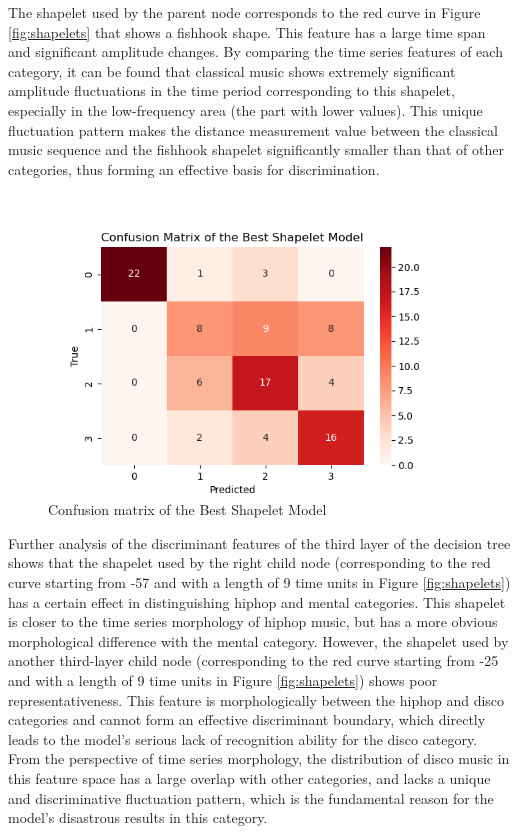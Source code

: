\noindent The shapelet used by the parent node corresponds to the red curve in Figure \ref{fig:shapelets} that shows a fishhook shape. This feature has a large time span and significant amplitude changes. By comparing the time series features of each category, it can be found that classical music shows extremely significant amplitude fluctuations in the time period corresponding to this shapelet, especially in the low-frequency area (the part with lower values). This unique fluctuation pattern makes the distance measurement value between the classical music sequence and the fishhook shapelet significantly smaller than that of other categories, thus forming an effective basis for discrimination.\\
\\
\begin{figure}[H]
	\centering
	\includegraphics[width=0.9\linewidth]{../Statistical_Sciences_template/figure/Confusion matrix of the Best Shapelet Model.png}
	\caption{Confusion matrix of the Best Shapelet Model}
	\label{fig:CMshapelet}
\end{figure}
\noindent Further analysis of the discriminant features of the third layer of the decision tree shows that the shapelet used by the right child node (corresponding to the red curve starting from -57 and with a length of 9 time units in Figure \ref{fig:shapelets}) has a certain effect in distinguishing hiphop and mental categories. This shapelet is closer to the time series morphology of hiphop music, but has a more obvious morphological difference with the mental category. However, the shapelet used by another third-layer child node (corresponding to the red curve starting from -25 and with a length of 9 time units in Figure \ref{fig:shapelets}) shows poor representativeness. This feature is morphologically between the hiphop and disco categories and cannot form an effective discriminant boundary, which directly leads to the model's serious lack of recognition ability for the disco category. From the perspective of time series morphology, the distribution of disco music in this feature space has a large overlap with other categories, and lacks a unique and discriminative fluctuation pattern, which is the fundamental reason for the model's disastrous results in this category.
